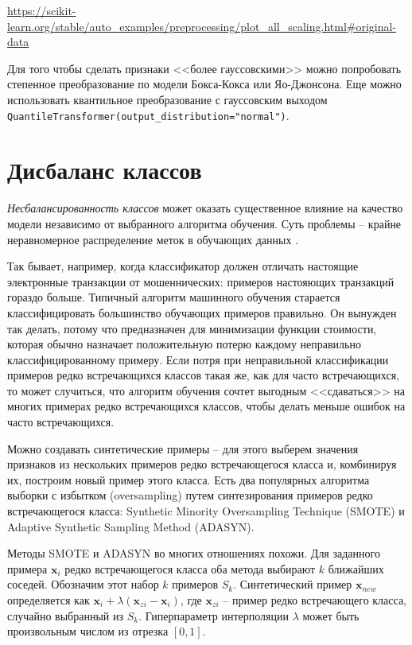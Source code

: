 \documentclass[%
	11pt,
	a4paper,
	utf8,
		]{article}
\begin{document}
\url{https://scikit-learn.org/stable/auto_examples/preprocessing/plot_all_scaling.html#original-data}

Для того чтобы сделать признаки <<более гауссовскими>> можно попробовать степенное преобразование по модели Бокса-Кокса или Яо-Джонсона. Еще можно использовать квантильное преобразование с гауссовским выходом \verb|QuantileTransformer(output_distribution="normal")|.




\section{Дисбаланс классов}

\emph{Несбалансированность классов} может оказать существенное влияние на качество модели независимо от выбранного алгоритма обучения. Суть проблемы -- крайне неравномерное распределение меток в обучающих данных \cite[]{burkov-engineer:2022}.

Так бывает, например, когда классификатор должен отличать настоящие электронные транзакции от мошеннических: примеров настояющих транзакций гораздо больше. Типичный алгоритм машинного обучения старается классифицировать большинство обучающих примеров правильно. Он вынужден так делать, потому что предназначен для минимизации функции стоимости, которая обычно назначает положительную потерю каждому неправильно классифицированному примеру. Если потря при неправильной классификации примеров редко встречающихся классов такая же, как для часто встречающихся, то может случиться, что алгоритм обучения сочтет выгодным <<сдаваться>> на многих примерах редко встречающихся классов, чтобы делать  меньше ошибок на часто встречающихся.

Можно создавать синтетические примеры -- для этого выберем значения признаков из нескольких примеров редко встречающегося класса и, комбинируя их, построим новый пример этого класса. Есть два популярных алгоритма выборки с избытком (oversampling) путем синтезирования примеров редко встречающегося класса: Synthetic Minority Oversampling Technique (SMOTE) и Adaptive Synthetic Sampling Method (ADASYN).

Методы SMOTE и ADASYN во многих отношениях похожи. Для заданного примера $ \mathbf{x}_i $ редко встречающегося класса оба метода выбирают $ k $ ближайших соседей. Обозначим этот набор $ k $ примеров $ S_k $. Синтетический пример $ \mathbf{x}_{new} $ определяется как $ \mathbf{x}_i + \lambda (\mathbf{x}_{zi} - \mathbf{x}_i) $, где $ \mathbf{x}_{zi} $ -- пример редко встречающего класса, случайно выбранный из $ S_k $. Гиперпараметр интерполяции $ \lambda $ может быть произвольным числом из отрезка $ [0, 1] $.
\end{document}
